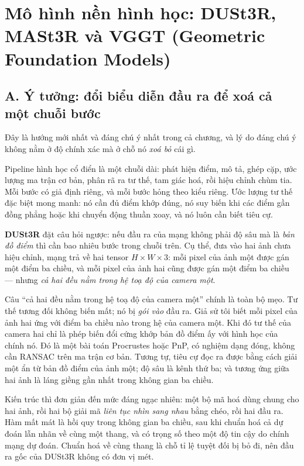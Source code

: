 \documentclass[../../deep_learning.tex]{subfiles}
\begin{document}
\section{Mô hình nền hình học: DUSt3R, MASt3R và VGGT (Geometric Foundation Models)}
\subsection{A. Ý tưởng: đổi biểu diễn đầu ra để xoá cả một chuỗi bước}
Đây là hướng mới nhất và đáng chú ý nhất trong cả chương, và lý do đáng chú ý không nằm ở độ chính xác mà ở chỗ nó \emph{xoá bỏ} cái gì.

Pipeline hình học cổ điển là một chuỗi dài: phát hiện điểm, mô tả, ghép cặp, ước lượng ma trận cơ bản, phân rã ra tư thế, tam giác hoá, rồi hiệu chỉnh chùm tia. Mỗi bước có giả định riêng, và mỗi bước hỏng theo kiểu riêng. Ước lượng tư thế đặc biệt mong manh: nó cần đủ điểm khớp đúng, nó suy biến khi các điểm gần đồng phẳng hoặc khi chuyển động thuần xoay, và nó luôn cần biết tiêu cự.

\textbf{DUSt3R} \cite{wang2024dust3r} đặt câu hỏi ngược: nếu đầu ra của mạng không phải độ sâu mà là \emph{bản đồ điểm} thì cần bao nhiêu bước trong chuỗi trên. Cụ thể, đưa vào hai ảnh chưa hiệu chỉnh, mạng trả về hai tensor \(H\times W\times 3\): mỗi pixel của ảnh một được gán một điểm ba chiều, và mỗi pixel của ảnh hai cũng được gán một điểm ba chiều --- nhưng \emph{cả hai đều nằm trong hệ toạ độ của camera một}.

Câu ``cả hai đều nằm trong hệ toạ độ của camera một'' chính là toàn bộ mẹo. Tư thế tương đối không biến mất; nó bị \emph{gói vào} đầu ra. Giả sử tôi biết mỗi pixel của ảnh hai ứng với điểm ba chiều nào trong hệ của camera một. Khi đó tư thế của camera hai chỉ là phép biến đổi cứng khớp bản đồ điểm ấy với hình học của chính nó. Đó là một bài toán Procrustes hoặc PnP, có nghiệm dạng đóng, không cần RANSAC trên ma trận cơ bản. Tương tự, tiêu cự đọc ra được bằng cách giải một ẩn từ bản đồ điểm của ảnh một; độ sâu là kênh thứ ba; và tương ứng giữa hai ảnh là láng giềng gần nhất trong không gian ba chiều.

Kiến trúc thì đơn giản đến mức đáng ngạc nhiên: một bộ mã hoá  dùng chung cho hai ảnh, rồi hai bộ giải mã \emph{liên tục nhìn sang nhau} bằng  chéo, rồi hai đầu ra. Hàm mất mát là hồi quy trong không gian ba chiều, sau khi chuẩn hoá cả dự đoán lẫn nhãn về cùng một thang, và có trọng số theo một độ tin cậy do chính mạng dự đoán. Chuẩn hoá về cùng thang là chỗ tỉ lệ tuyệt đối bị bỏ đi, nên đầu ra gốc của DUSt3R không có đơn vị mét.
\end{document}
